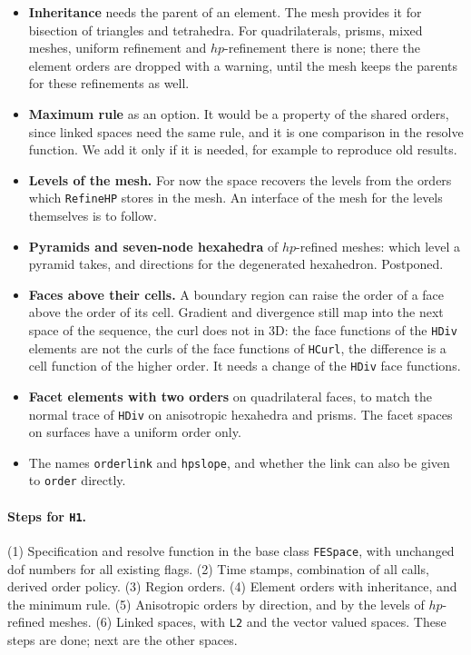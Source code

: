 \documentclass[10pt,a4paper]{article}
\newcommand{\code}[1]{\texttt{#1}}
\begin{document}
\begin{itemize}\setlength\itemsep{1pt}
\item \textbf{Inheritance} needs the parent of an element. The mesh provides it for bisection of triangles and tetrahedra. For quadrilaterals, prisms, mixed meshes, uniform refinement and $hp$-refinement there is none; there the element orders are dropped with a warning, until the mesh keeps the parents for these refinements as well.
\item \textbf{Maximum rule} as an option. It would be a property of the shared orders, since linked spaces need the same rule, and it is one comparison in the resolve function. We add it only if it is needed, for example to reproduce old results.
\item \textbf{Levels of the mesh.} For now the space recovers the levels from the orders which \code{RefineHP} stores in the mesh. An interface of the mesh for the levels themselves is to follow.
\item \textbf{Pyramids and seven-node hexahedra} of $hp$-refined meshes: which level a pyramid takes, and directions for the degenerated hexahedron. Postponed.
\item \textbf{Faces above their cells.} A boundary region can raise the order of a face above the order of its cell. Gradient and divergence still map into the next space of the sequence, the curl does not in 3D: the face functions of the \code{HDiv} elements are not the curls of the face functions of \code{HCurl}, the difference is a cell function of the higher order. It needs a change of the \code{HDiv} face functions.
\item \textbf{Facet elements with two orders} on quadrilateral faces, to match the normal trace of \code{HDiv} on anisotropic hexahedra and prisms. The facet spaces on surfaces have a uniform order only.
\item The names \code{orderlink} and \code{hpslope}, and whether the link can also be given to \code{order} directly.
\end{itemize}

\paragraph{Steps for \code{H1}.} (1) Specification and resolve function in the base class \code{FESpace}, with unchanged dof numbers for all existing flags. (2) Time stamps, combination of all calls, derived order policy. (3) Region orders. (4) Element orders with inheritance, and the minimum rule. (5) Anisotropic orders by direction, and by the levels of $hp$-refined meshes. (6) Linked spaces, with \code{L2} and the vector valued spaces. These steps are done; next are the other spaces.
\end{document}
